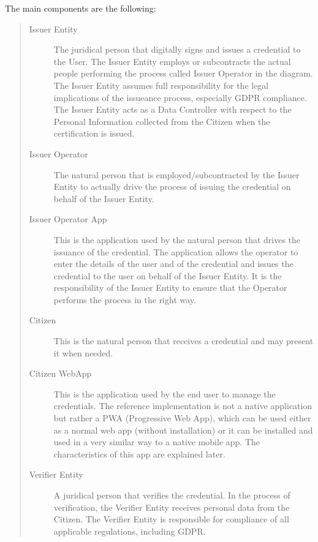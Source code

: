 \documentclass[a4paper,12pt,english]{sphinxhowto}
\begin{document}
\sphinxAtStartPar
The main components are the following:
\begin{quote}\begin{description}
\item[{Issuer Entity}] \leavevmode
\sphinxAtStartPar
The juridical person that digitally signs and issues a credential to the User. The Issuer Entity employs or subcontracts the actual people performing the process called Issuer Operator in the diagram. The Issuer Entity assumes full responsibility for the legal implications of the issueance process, especially GDPR compliance. The Issuer Entity acts as a Data Controller with respect to the Personal Information collected from the Citizen when the certification is issued.

\item[{Issuer Operator}] \leavevmode
\sphinxAtStartPar
The natural person that is employed/subcontracted by the Issuer Entity to actually drive the process of issuing the credential on behalf of the Issuer Entity.

\item[{Issuer Operator App}] \leavevmode
\sphinxAtStartPar
This is the application used by the natural person that drives the issuance of the credential. The application allows the operator to enter the details of the user and of the credential and issues the credential to the user on behalf of the Issuer Entity. It is the responsibility of the Issuer Entity to ensure that the Operator performs the process in the right way.

\item[{Citizen}] \leavevmode
\sphinxAtStartPar
This is the natural person that receives a credential and may present it when needed.

\item[{Citizen  WebApp}] \leavevmode
\sphinxAtStartPar
This is the application used by the end user to manage the credentials. The reference implementation is not a native application but rather a PWA (Progressive Web App), which can be used either as a normal web app (without installation) or it can be installed and used in a very similar way to a native mobile app. The characteristics of this app are explained later.

\item[{Verifier Entity}] \leavevmode
\sphinxAtStartPar
A juridical person that verifies the credential. In the process of verification, the Verifier Entity receives personal data from the Citizen. The Verifier Entity is responsible for compliance of all applicable regulations, including GDPR.


\end{description}
\end{quote}
\end{document}

